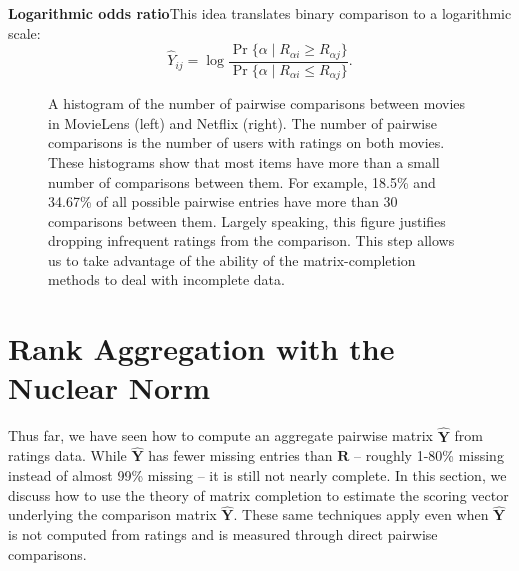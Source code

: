 \documentclass{sig-alternate}
\newcommand{\mat}{\boldsymbol}
\providecommand{\mYhat}{\ensuremath{\mat{\hat{\mY}}}}
\providecommand{\mR}{\ensuremath{\mat{R}}}
\providecommand{\mY}{\ensuremath{\mat{Y}}}
\begin{document}
\begin{compactenum}
\item \textbf{Logarithmic odds ratio}\quad This idea translates
binary comparison to a logarithmic scale:
\[
\hat{Y}_{ij}=\log\frac{\Pr\{\alpha\mid R_{\alpha i}\geq R_{\alpha j}\}}{\Pr\{\alpha\mid R_{\alpha i}\leq R_{\alpha j}\}}.
\]
\end{compactenum}





\begin{figure*}
\centering
{}  
\quad 
{}  
\caption{A histogram of the number of pairwise comparisons 
between movies in MovieLens (left) and Netflix (right).  The 
number of pairwise comparisons is the number of users with ratings
on both movies.  These histograms show that most items
have more than a small number of comparisons between them.  
For example, 18.5\% and 34.67\% of all possible pairwise
entries have more than 30 
comparisons between them.  Largely speaking, this figure
justifies dropping infrequent ratings from the comparison.
This step allows us to take advantage of the ability
of the matrix-completion methods to deal with incomplete
data. }
\label{fig:pairwise}
\end{figure*}



\section{Rank Aggregation with the\\ Nuclear Norm} 
\label{sec:ranking-nn}

Thus far, we have seen how to compute an aggregate
pairwise matrix $\mYhat$ from ratings data.
While $\mYhat$ has fewer missing entries than $\mR$ --
roughly 1-80\% missing instead of almost 99\% missing
-- it is still not nearly complete.  
In this section, we discuss how to use the theory
of matrix completion to estimate the scoring
vector underlying the comparison matrix $\mYhat$.
These same techniques apply even when $\mYhat$ is not
computed from ratings and is measured through
direct pairwise comparisons.  
\end{document}
